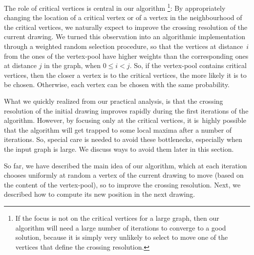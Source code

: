 \documentclass[runningheads]{llncs}
\begin{document}
The role of critical vertices is central in our algorithm
\footnote{If the focus is not on the critical vertices for a large graph, then our algorithm will need a large number of iterations to converge to a good solution, because it is simply very unlikely to select to move one of the vertices that define the crossing resolution.}: By appropriately changing the location of a critical vertex or of a vertex in the neighbourhood of the critical vertices, we naturally expect to improve the crossing resolution of the current drawing. We turned this observation into an algorithmic implementation through a weighted random selection procedure, so that the vertices at distance~$i$ from the ones of the vertex-pool have higher weights than the corresponding ones at distance $j$  in the graph, when $0 \leq i<j$. So, if the vertex-pool contains critical vertices, then the closer a vertex is to the critical vertices, the more likely it is to be chosen. Otherwise, each vertex can be chosen with the same probability.

What we quickly realized from our practical analysis, is that the crossing resolution of the initial drawing improves rapidly during the first iterations of the algorithm. However, by focusing only at the critical vertices, it is~highly possible that the algorithm will get trapped to some local maxima after a number of iterations. So, special care is needed to avoid these bottlenecks, especially when the input graph is large. We discuss ways to avoid them later in this section.

So far, we have described the main idea of our algorithm, which at each iteration chooses uniformly at random a vertex of the current drawing to move (based on the content of the vertex-pool), so to improve the crossing resolution. Next, we  described how to compute its new position in the next drawing.  
\end{document}
